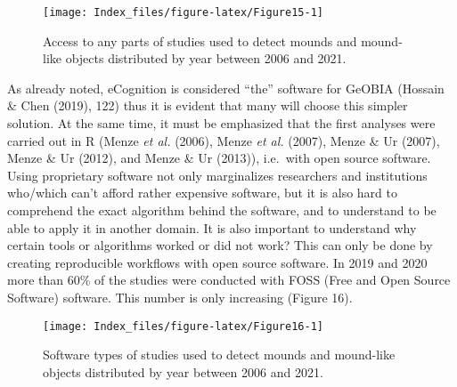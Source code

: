 \documentclass[
  12pt,
]{article}
\begin{document}
\begin{figure}

{\centering \texttt{[image: Index\_files/figure-latex/Figure15-1]} 

}

\caption{Access to any parts of  studies used to detect mounds and mound-like objects distributed by year between 2006 and 2021.}\label{fig:Figure15}
\end{figure}

As already noted, eCognition is considered ``the'' software for GeOBIA (Hossain \& Chen (2019), 122) thus it is evident that many will choose this simpler solution. At the same time, it must be emphasized that the first analyses were carried out in R (Menze \emph{et al.} (2006), Menze \emph{et al.} (2007), Menze \& Ur (2007), Menze \& Ur (2012), and Menze \& Ur (2013)), i.e.~with open source software. Using proprietary software not only marginalizes researchers and institutions who/which can't afford rather expensive software, but it is also hard to comprehend the exact algorithm behind the software, and to understand to be able to apply it in another domain. It is also important to understand why certain tools or algorithms worked or did not work? This can only be done by creating reproducible workflows with open source software. In 2019 and 2020 more than 60\% of the studies were conducted with FOSS (Free and Open Source Software) software. This number is only increasing (Figure 16).

\begin{figure}

{\centering \texttt{[image: Index\_files/figure-latex/Figure16-1]} 

}

\caption{Software types of studies used to detect mounds and mound-like objects distributed by year between 2006 and 2021.}\label{fig:Figure16}
\end{figure}
\end{document}
